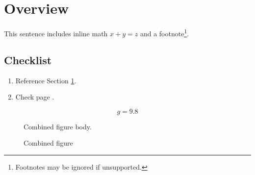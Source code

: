 \documentclass{article}
\begin{document}
\section{Overview}\label{sec:overview}
This sentence includes inline math $x + y = z$ and a footnote\footnote{Footnotes may be ignored if unsupported.}.

\subsection{Checklist}
\begin{enumerate}
\item Reference Section \ref{sec:overview}.
\item Check page \pageref{fig:combined}.
\end{enumerate}

\begin{equation}
g = 9.8
\end{equation}

\begin{figure}
Combined figure body.
\caption{Combined figure}
\label{fig:combined}
\end{figure}
\end{document}
